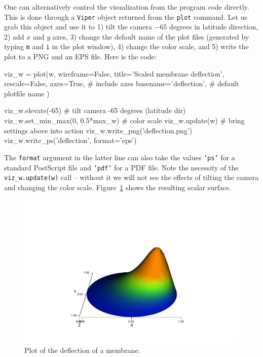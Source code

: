 One can alternatively control the visualization from the program code
directly. This is done through a {\fontsize{10pt}{10pt}\texttt{Viper}} object returned from
the {\fontsize{10pt}{10pt}\texttt{plot}} command. Let us grab this object and use it to
1) tilt the camera $-65$ degrees in latitude direction, 2) add
$x$ and $y$ axes, 3) change the default name of the plot files (generated
by typing {\fontsize{10pt}{10pt}\texttt{m}} and {\fontsize{10pt}{10pt}\texttt{i}} in the plot window),
4) change the color scale, and 5) write the plot
to a PNG and an EPS file. Here is the code:
\begin{python}
viz_w = plot(w, 
            wireframe=False,
            title='Scaled membrane deflection',
            rescale=False,
            axes=True,              # include axes
            basename='deflection',  # default plotfile name
            )

viz_w.elevate(-65) # tilt camera -65 degrees (latitude dir)
viz_w.set_min_max(0, 0.5*max_w)  # color scale
viz_w.update(w)    # bring settings above into action
viz_w.write_png('deflection.png')
viz_w.write_ps('deflection', format='eps')
\end{python}
The {\fontsize{10pt}{10pt}\texttt{format}} argument in the latter line can also take the values
{\fontsize{10pt}{10pt}\texttt{'ps'}} for a standard PostScript file and {\fontsize{10pt}{10pt}\texttt{'pdf'}} for
a PDF file.
Note the necessity of the {\fontsize{10pt}{10pt}\verb!viz_w.update(w)!} call -- without it we will
not see the effects of tilting the camera and changing the color scale.
Figure~\ref{langtangen:poisson:2D:fig1} shows the resulting scalar surface.
\begin{figure}
\label{langtangen:poisson:2D:fig1}
  \centerline{
   \includegraphics[width=0.6\linewidth]{chapters/langtangen/pdf/membrane_waxis.pdf}}
  \caption{
  Plot of the deflection of a membrane.
  }
\end{figure}


